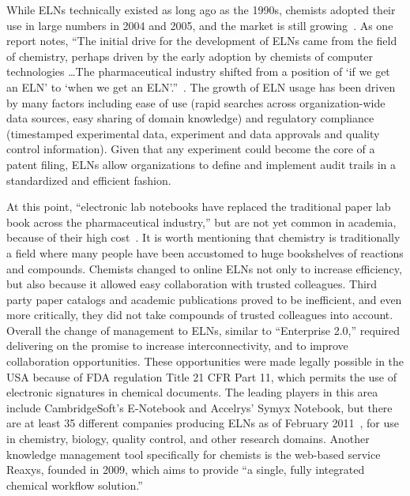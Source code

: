 \documentclass{sig-alternate}
\begin{document}
While ELNs technically existed as long ago as the 1990s, chemists
adopted their use in large numbers in 2004 and 2005, and the market is
still growing~\cite{ELNstatus}. As one report notes, ``The initial
drive for the development of ELNs came from the field of chemistry,
perhaps driven by the early adoption by chemists of computer
technologies \ldots The pharmaceutical industry shifted from a
position of `if we get an ELN' to `when we get an
ELN'.''~\cite{ELNstatus}. The growth of ELN usage has been
driven by many factors including ease of use (rapid searches across
organization-wide data sources, easy sharing of domain knowledge) and
regulatory compliance (timestamped experimental data, experiment and
data approvals and quality control information). Given that any experiment could
become the core of a patent filing, ELNs allow organizations to define
and implement audit trails in a standardized and efficient fashion.

At this point, ``electronic lab notebooks have replaced the
traditional paper lab book across the pharmaceutical industry,'' but
are not yet common in academia, because of their high
cost~\cite{WavingGoodbye}.  It is worth mentioning that chemistry is
traditionally a field where many people have been accustomed to huge
bookshelves of reactions and compounds. Chemists changed to online
ELNs not only to increase efficiency, but also because it allowed easy
collaboration with trusted colleagues. Third party paper catalogs and
academic publications proved to be inefficient, and even more
critically, they did not take compounds of trusted colleagues into
account. Overall the change of management to ELNs, similar to
``Enterprise 2.0,'' required delivering on the promise to increase
interconnectivity, and to improve collaboration opportunities.  These opportunities were made legally possible in the USA because of FDA regulation Title 21 CFR Part 11, which permits the use of electronic signatures in chemical documents.  The
leading players in this area include CambridgeSoft's E-Notebook and
Accelrys' Symyx Notebook, but there are at least 35 different
companies producing ELNs as of February 2011~\cite{ELNreview}, for use
in chemistry, biology, quality control, and other research domains.  Another
knowledge management tool specifically for chemists is the web-based
service Reaxys, founded in 2009, which aims to provide ``a
single, fully integrated chemical workflow solution.''
\end{document}
